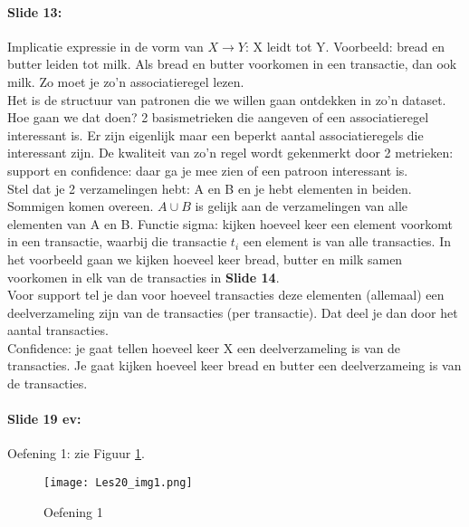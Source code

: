 \documentclass[10pt,a4paper]{report}
\begin{document}
\paragraph{Slide 13:}Implicatie expressie in de vorm van $X \rightarrow Y$: X leidt tot Y. Voorbeeld: bread en butter leiden tot milk. Als bread en butter voorkomen in een transactie, dan ook milk. Zo moet je zo'n associatieregel lezen.\\ 
Het is de structuur van patronen die we willen gaan ontdekken in zo'n dataset. Hoe gaan we dat doen? 2 basismetrieken die aangeven of een associatieregel interessant is. Er zijn eigenlijk maar een beperkt aantal associatieregels die interessant zijn. De kwaliteit van zo'n regel wordt gekenmerkt door 2 metrieken: support en confidence: daar ga je mee zien of een patroon interessant is. \\
Stel dat je 2 verzamelingen hebt: A en B en je hebt elementen in beiden. Sommigen komen overeen. $A \cup B$ is gelijk aan de verzamelingen van alle elementen van A en B. Functie sigma: kijken hoeveel keer een element voorkomt in een transactie, waarbij die transactie $t_{i}$ een element is van alle transacties.
In het voorbeeld gaan we kijken hoeveel keer bread, butter en milk samen voorkomen in elk van de transacties in \textbf{Slide 14}. \\
Voor support tel je dan voor hoeveel transacties deze elementen (allemaal) een deelverzameling zijn van de transacties (per transactie). Dat deel je dan door het aantal transacties.\\
Confidence: je gaat tellen hoeveel keer X een deelverzameling is van de transacties. Je gaat kijken hoeveel keer bread en butter een deelverzameing is van de transacties.

\paragraph{Slide 19 ev:}Oefening 1: zie Figuur \ref{Les20_1}.

\begin{figure}[ht!]
\centering
\texttt{[image: Les20\_img1.png]}
\caption{Oefening 1 \label{Les20_1}}
\end{figure}
\end{document}
